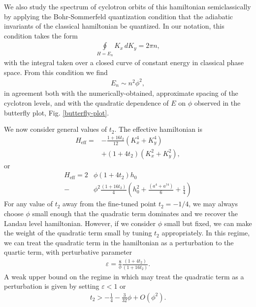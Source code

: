 \documentclass[aps,prb,twocolumn,letterpaper,twoside,nobalancelastpage,groupedaddress,amsmath,amssymb,floatfix,citeautoscript]{revtex4-1}
\begin{document}
We also study the spectrum of cyclotron orbits of this hamiltonian semiclassically by applying the Bohr-Sommerfeld quantization condition that the adiabatic invariants of the classical hamiltonian be quantized. In our notation, this condition takes the form
\begin{align*}
\oint\limits_{H=E_n} K_x\, dK_y = 2\pi n,
\end{align*}
with the integral taken over a closed curve of constant energy in classical phase space. From this condition we find
\begin{align*}
E_n \sim n^2\phi^2, 
\end{align*}
in agreement both with the numerically-obtained, approximate spacing of the cyclotron levels, and with the quadratic dependence of $E$ on $\phi$ observed in the butterfly plot, Fig. \ref{butterfly-plot}.

We now consider general values of $t_2$. The effective hamiltonian is
\begin{align}
\label{t2-hamiltonian}
H_{\text{eff}} = &-\frac{1 + 16t_2}{12}\left(K_x^4 + K_y^4\right)\nonumber\\ &+ \left(1 + 4t_2\right) \left(K_x^2 + K_y^2\right),
\end{align}
or
\begin{align*}
H_{\text{eff}} = 2&\phi\left(1 + 4t_2\right) h_0\\  - &\phi^2\frac{\left(1 + 16t_2\right)}{4} \left(h_0^2 + \frac{\left(a^{4} + a^{\dag 4}\right)}{6} + \frac{1}{4}\right)
\end{align*}
For any value of $t_2$ away from the fine-tuned point $t_2 = -1/4$, we may always choose $\phi$ small enough that the quadratic term dominates and we recover the Landau level hamiltonian. However, if we consider $\phi$ small but fixed, we can make the weight of the quadratic term small by tuning $t_2$ appropriately. In this regime, we can treat the quadratic term in the hamiltonian as a perturbation to the quartic term, with perturbative parameter
\begin{align*}
\varepsilon = \frac{8}{\phi}\frac{\left(1 + 4t_2\right)}{\left(1 + 16t_2\right)}.
\end{align*}
A weak upper bound on the regime in which may treat the quadratic term as a perturbation is given by setting $\varepsilon < 1$ or
\begin{align*}
t_2 > -\frac{1}{4} - \frac{3}{32}\phi +O(\phi^2).
\end{align*}
\end{document}
